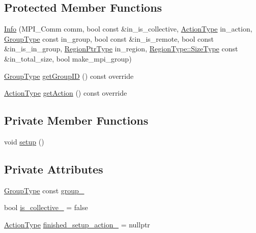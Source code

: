 \subsection*{Protected Member Functions}
\begin{DoxyCompactItemize}
\item 
\hyperlink{structvt_1_1group_1_1_info_ae1f69cd3040c001f9c6df8136293fffb}{Info} (M\+P\+I\+\_\+\+Comm comm, bool const \&in\+\_\+is\+\_\+collective, \hyperlink{namespacevt_ae0a5a7b18cc99d7b732cb4d44f46b0f3}{Action\+Type} in\+\_\+action, \hyperlink{namespacevt_a27b5e4411c9b6140c49100e050e2f743}{Group\+Type} const in\+\_\+group, bool const \&in\+\_\+is\+\_\+remote, bool const \&in\+\_\+is\+\_\+in\+\_\+group, \hyperlink{structvt_1_1group_1_1_info_rooted_a127ac5ebcfb9871621c1f66dba481c0b}{Region\+Ptr\+Type} in\+\_\+region, \hyperlink{structvt_1_1group_1_1region_1_1_region_a9bb381adf31111aae34dbc644bad6c1f}{Region\+Type\+::\+Size\+Type} const \&in\+\_\+total\+\_\+size, bool make\+\_\+mpi\+\_\+group)
\item 
\hyperlink{namespacevt_a27b5e4411c9b6140c49100e050e2f743}{Group\+Type} \hyperlink{structvt_1_1group_1_1_info_a09fcb16e74a5ae3043859ae70b5b57a9}{get\+Group\+ID} () const override
\item 
\hyperlink{namespacevt_ae0a5a7b18cc99d7b732cb4d44f46b0f3}{Action\+Type} \hyperlink{structvt_1_1group_1_1_info_a399b8266c01f53484469b3b14cdc8640}{get\+Action} () const override
\end{DoxyCompactItemize}
\subsection*{Private Member Functions}
\begin{DoxyCompactItemize}
\item 
void \hyperlink{structvt_1_1group_1_1_info_a34f6c2476f76341f61a17d0b315e2792}{setup} ()
\end{DoxyCompactItemize}
\subsection*{Private Attributes}
\begin{DoxyCompactItemize}
\item 
\hyperlink{namespacevt_a27b5e4411c9b6140c49100e050e2f743}{Group\+Type} const \hyperlink{structvt_1_1group_1_1_info_acf2b210e3a0cb0d52649e42f07bc2503}{group\+\_\+}
\item 
bool \hyperlink{structvt_1_1group_1_1_info_acd32c5194bb1d6ac815b1f20cda1944d}{is\+\_\+collective\+\_\+} = false
\item 
\hyperlink{namespacevt_ae0a5a7b18cc99d7b732cb4d44f46b0f3}{Action\+Type} \hyperlink{structvt_1_1group_1_1_info_a40d013d297772502f189d08c7d474a6f}{finished\+\_\+setup\+\_\+action\+\_\+} = nullptr
\end{DoxyCompactItemize}
